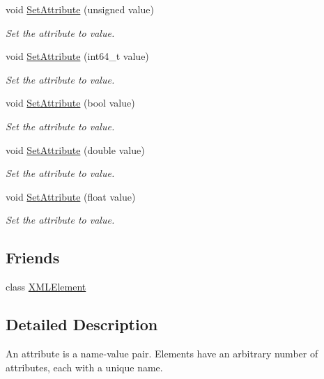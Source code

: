 \begin{DoxyCompactItemize}
void \mbox{\hyperlink{classtinyxml2_1_1_x_m_l_attribute_ae70468c0f6df2748ba3529c716999fae}{Set\+Attribute}} (unsigned value)
\begin{DoxyCompactList}\small\item\em Set the attribute to value. \end{DoxyCompactList}\item 
void \mbox{\hyperlink{classtinyxml2_1_1_x_m_l_attribute_a7c1240f479722b9aa29b6c030aa116c2}{Set\+Attribute}} (int64\+\_\+t value)
\begin{DoxyCompactList}\small\item\em Set the attribute to value. \end{DoxyCompactList}\item 
void \mbox{\hyperlink{classtinyxml2_1_1_x_m_l_attribute_ab3516def4fe058fe328f2b89fc2d77da}{Set\+Attribute}} (bool value)
\begin{DoxyCompactList}\small\item\em Set the attribute to value. \end{DoxyCompactList}\item 
void \mbox{\hyperlink{classtinyxml2_1_1_x_m_l_attribute_a9a65ab3147abe8ccbbd373ce8791e818}{Set\+Attribute}} (double value)
\begin{DoxyCompactList}\small\item\em Set the attribute to value. \end{DoxyCompactList}\item 
void \mbox{\hyperlink{classtinyxml2_1_1_x_m_l_attribute_ae95e843313aaf5d56c32530b6456df02}{Set\+Attribute}} (float value)
\begin{DoxyCompactList}\small\item\em Set the attribute to value. \end{DoxyCompactList}\end{DoxyCompactItemize}
\subsection*{Friends}
\begin{DoxyCompactItemize}
\item 
class \mbox{\hyperlink{classtinyxml2_1_1_x_m_l_attribute_ac2fba9b6e452829dd892f7392c24e0eb}{X\+M\+L\+Element}}
\end{DoxyCompactItemize}


\subsection{Detailed Description}
An attribute is a name-\/value pair. Elements have an arbitrary number of attributes, each with a unique name.


